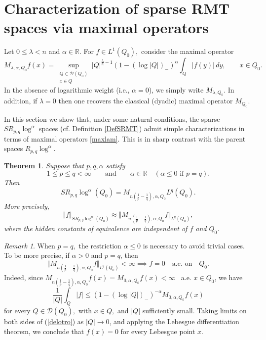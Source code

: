 \documentclass[11pt, a4paper,leqno]{amsart}
\newtheorem{theorem}{Theorem}
\theoremstyle{plain}
\numberwithin{equation}{section}
\theoremstyle{definition}
\theoremstyle{remark}
\newtheorem{remark}{Remark}
\def\R{\mathbb{R}}
\begin{document}
\section{Characterization of sparse RMT spaces via maximal
operators\label{sec:sparsedommax}}




Let
$0\leq\lambda<n$ and $\alpha \in \R$. For $f\in L^{1}(Q_{0}),$  consider the maximal operator
\begin{equation}
M_{\lambda,\alpha,Q_{0}}f(x)=\sup_{\substack{Q\in\mathcal{D}(Q_{0})\\x\in
Q}} |Q|^{\frac{\lambda}{n}-1}  (1-(\log|Q|)_{-})^{\alpha}\int_{Q}|f(y)| \,dy,\qquad x\in Q_{0}%
.\label{maxlam}%
\end{equation}
In the absence of logarithmic weight (i.e., $\alpha=0$), we simply  write
$M_{\lambda,Q_{0}}$. In addition, if $\lambda=0$ then one recovers the classical
(dyadic) maximal operator $M_{Q_{0}}$.

In this section we show that, under some natural conditions, the sparse
$SR_{p,q}\log^{\alpha}$ spaces (cf. Definition \ref{DefSRMT}) admit simple characterizations in
terms of maximal operators \eqref{maxlam}. This is in sharp contrast with the parent spaces
$R_{p,q}\log^{\alpha}$. 

\begin{theorem}
\label{ThmSparseRieszMaximal} Suppose that $p,q,\alpha$ satisfy
\begin{equation}
1\leq p\leq q<\infty\qquad\text{and}\qquad\alpha\in\mathbb{R}\quad(\alpha
\leq0\text{ if }p=q). \label{AssumptionMon}%
\end{equation}
Then 
\[
SR_{p,q}\log^{\alpha}(Q_{0})=M_{n(\frac{1}{p}-\frac{1}{q}),\alpha,Q_{0}}%
L^{q}(Q_{0}).
\]
More precisely,
\begin{equation*}
\Vert f\Vert_{SR_{p,q}\log^{\alpha}(Q_{0})}\approx\Vert M_{n(\frac{1}{p}%
-\frac{1}{q}),\alpha,Q_{0}}f\Vert_{L^{q}(Q_{0})},
\end{equation*}
where the hidden constants of equivalence are independent of $f$ and $Q_{0}$.
\end{theorem}

\begin{remark}
When $p=q,$ the restriction $\alpha\leq0$ is necessary to avoid trivial cases.
To be more precise, if $\alpha>0$ and $p=q$, then
\[
\Vert M_{n(\frac{1}{p}-\frac{1}{q}),\alpha,Q_{0}}f\Vert_{L^{q}(Q_{0})}%
<\infty\implies f=0\quad\text{a.e. on}\quad Q_{0}.
\]
Indeed, since $M_{n(\frac{1}{p}-\frac{1}{q}),\alpha,Q_{0}}f(x)=M_{0,\alpha
,Q_{0}}f(x)<\infty$ \ a.e. $x\in Q_{0}$, we have
\begin{equation}
\frac{1}{|Q|}\int_{Q}|f|\leq(1-(\log|Q|)_{-})^{-\alpha}M_{0,\alpha,Q_{0}%
}f(x)\label{delotro}%
\end{equation}
for every $Q\in\mathcal{D}(Q_{0}),$ with $x\in Q,$ and $|Q|$ sufficiently
small. Taking limits on both sides of (\ref{delotro}) as $|Q|\rightarrow0$,
and applying the Lebesgue differentiation theorem, we conclude that $f(x)=0$
for every Lebesgue point $x$.
\end{remark}
\end{document}
